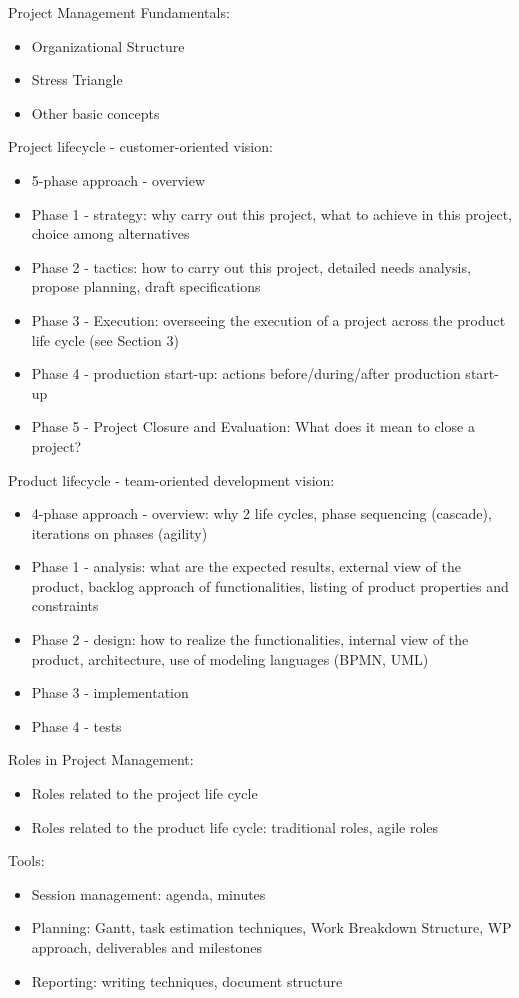 Project Management Fundamentals:
\begin{itemize}
    \item Organizational Structure
    \item Stress Triangle
    \item Other basic concepts
\end{itemize}
Project lifecycle - customer-oriented vision:
\begin{itemize}
    \item 5-phase approach - overview
    \item Phase 1 - strategy: why carry out this project, what to achieve in this project, choice among alternatives
    \item Phase 2 - tactics: how to carry out this project, detailed needs analysis, propose planning, draft specifications
    \item Phase 3 - Execution: overseeing the execution of a project across the product life cycle (see Section 3)
    \item Phase 4 - production start-up: actions before/during/after production start-up
    \item Phase 5 - Project Closure and Evaluation: What does it mean to close a project?
\end{itemize}
Product lifecycle - team-oriented development vision:
\begin{itemize}
    \item 4-phase approach - overview: why 2 life cycles, phase sequencing (cascade), iterations on phases (agility)
    \item Phase 1 - analysis: what are the expected results, external view of the product, backlog approach of functionalities, listing of product properties and constraints
    \item Phase 2 - design: how to realize the functionalities, internal view of the product, architecture, use of modeling languages (BPMN, UML)
    \item Phase 3 - implementation
    \item Phase 4 - tests
\end{itemize}
Roles in Project Management:
\begin{itemize}
    \item Roles related to the project life cycle
    \item Roles related to the product life cycle: traditional roles, agile roles
\end{itemize}
Tools:
\begin{itemize}
    \item Session management: agenda, minutes
    \item Planning: Gantt, task estimation techniques, Work Breakdown Structure, WP approach, deliverables and milestones
    \item Reporting: writing techniques, document structure
\end{itemize}